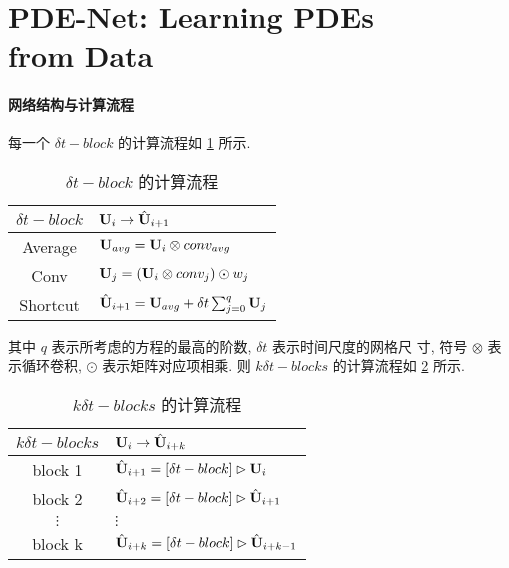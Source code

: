 \section{PDE-Net: Learning PDEs \\from Data}
\paragraph{网络结构与计算流程}
每一个 $\delta t-block$ 的计算流程如 \ref{tab:pde-net-dtblock} 所示.

\begin{table}[h]
\begin{tabular}{cl}
\toprule
$\delta t-block$ & ${\mathbf U}_i \to \hat {{\mathbf U}}_{i + 1}$ \\
\midrule
Average & ${\mathbf U}_{avg} = {\mathbf U}_i \otimes conv_{avg}$ \\
Conv & ${\mathbf U}_j = ({\mathbf U}_i \otimes conv_j) \odot w_j$ \\
Shortcut & $\hat {{\mathbf U}}_{i + 1} = {\mathbf U}_{avg} + \delta t \sum_{j=0}^q {\mathbf U}_j$ \\
\bottomrule
\end{tabular}
\caption{$\delta t-block$ 的计算流程}
\label{tab:pde-net-dtblock}
\end{table}

\noindent 其中 $q$ 表示所考虑的方程的最高的阶数, $\delta t$ 表示时间尺度的网格尺
寸, 符号 $\otimes$ 表示循环卷积, $\odot$ 表示矩阵对应项相乘. 则
$k\delta t-blocks$ 的计算流程如 \ref{tab:pde-net-kdtblocks} 所示.

\begin{table}[h]
\begin{tabular}{cl}
\toprule
$k\delta t-blocks$ & ${\mathbf U}_i \to \hat {{\mathbf U}}_{i + k}$ \\
\midrule
block 1 & $\hat {{\mathbf U}}_{i + 1} = [\delta t-block]\rhd{\mathbf U}_i$ \\
block 2 & $\hat {{\mathbf U}}_{i + 2} = [\delta t-block]\rhd\hat{{\mathbf U}}_{i + 1}$ \\
$\vdots$ & $\vdots$ \\
block k & $\hat {{\mathbf U}}_{i + k} = [\delta t-block]\rhd\hat{{\mathbf U}}_{i+k-1}$ \\
\bottomrule
\end{tabular}
\caption{$k\delta t-blocks$ 的计算流程}
\label{tab:pde-net-kdtblocks}
\end{table}

